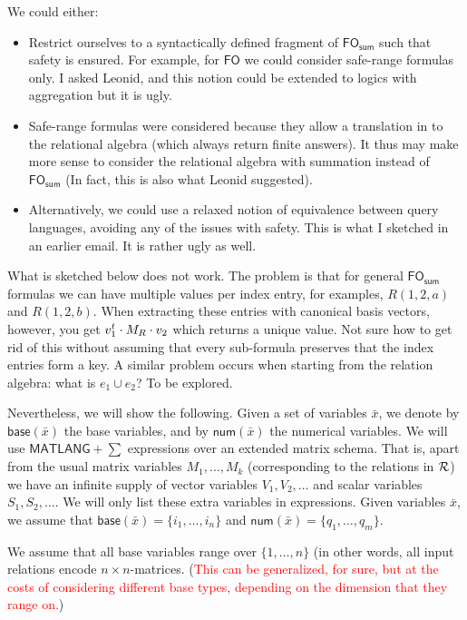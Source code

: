 We could either:
\begin{itemize}
\item Restrict ourselves to a syntactically defined fragment of $\textsf{FO}_{\textsf{sum}}$ such that safety is ensured. For example, for $\textsf{FO}$ we could consider safe-range formulas only. I asked Leonid, and this notion could be extended to logics with aggregation but it is ugly. 
\item Safe-range formulas were considered because they allow a translation in to the relational algebra (which always return finite answers). It thus may make more sense to consider the relational algebra with summation instead of   $\textsf{FO}_{\textsf{sum}}$ (In fact, this is also what Leonid suggested).
\item Alternatively, we could use a relaxed notion of equivalence between query languages, avoiding any of the issues with safety. This is what I sketched in an earlier email. It is rather ugly as well.
\end{itemize}

\begin{todo}
What is sketched below does not work. The problem is that for general $\textsf{FO}_{\textsf{sum}}$ formulas we can have multiple values per index entry, for examples, $R(1,2,a)$ and $R(1,2,b)$.
When extracting these entries with canonical basis vectors, however, you get $v_1^t\cdot M_R\cdot v_2$ which returns a unique value. Not sure how to get rid of this without assuming that every
sub-formula preserves that the index entries form a key. A similar problem occurs when starting from the relation algebra: what is $e_1\cup e_2$? To be explored.
\end{todo}


Nevertheless, we will show the following. Given a set of variables $\bar x$, we denote by $\textsf{base}(\bar x)$ the base variables, and by $\textsf{num}(\bar x)$  the numerical variables.
We will use $\textsf{MATLANG}+\sum$ expressions over an extended matrix schema. That is, apart from the usual matrix variables $M_1,\ldots,M_k$ (corresponding to the relations in ${\cal R}$)
we have an infinite supply of vector variables $V_1,V_2,\ldots$ and scalar variables $S_1,S_2,\ldots$. We will only list these extra variables in expressions.
Given variables $\bar x$, we assume that $\textsf{base}(\bar x)=\{i_1,\ldots,i_n\}$
and  $\textsf{num}(\bar x)=\{q_1,\ldots,q_m\}$. 

We assume that all base variables range over $\{1,\ldots,n\}$ (in other words, all input relations encode $n\times n$-matrices. (\textcolor{red}{This can be generalized, for sure, but at the costs
of considering different base types, depending on the dimension that they range on.})

